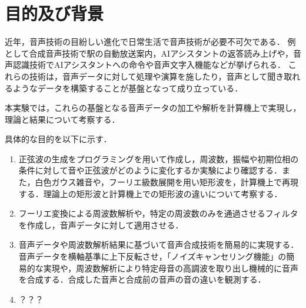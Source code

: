 \chapter{目的及び背景}
近年，音声技術の目紛しい進化で日常生活で音声技術が必要不可欠である．
例として合成音声技術で駅の自動放送案内，AIアシスタントの返答読み上げや，音声認識技術でAIアシスタントへの命令や音声文字入機能などが挙げられる．
これらの技術は，音声データに対して処理や演算を施したり，音声として聞き取れるようなデータを構築することが基盤となって成り立っている．\par
本実験では，これらの基盤となる音声データの加工や解析を計算機上で実現し，理論と結果について考察する．\par
具体的な目的を以下に示す．
\begin{enumerate}
    \item 正弦波の生成をプログラミングを用いて作成し，周波数，振幅や初期位相の条件に対して音や正弦波がどのように変化するか実験により確認する．また，白色ガウス雑音や，フーリエ級数展開を用い矩形波を，計算機上で再現する．理論上の矩形波と計算機上での矩形波の違いについて考察する．
    \item フーリエ変換による周波数解析や，特定の周波数のみを通過させるフィルタを作成し，音声データに対して適用させる．
    \item 音声データや周波数解析結果に基づいて音声合成技術を簡易的に実現する．音声データを横軸基準に上下反転させ，「ノイズキャンセリング機能」の簡易的な実現や，周波数解析により特定母音の高調波を取り出し機械的に音声を合成する．合成した音声と合成前の音声の音の違いを観測する．
    \item ？？？
\end{enumerate}


